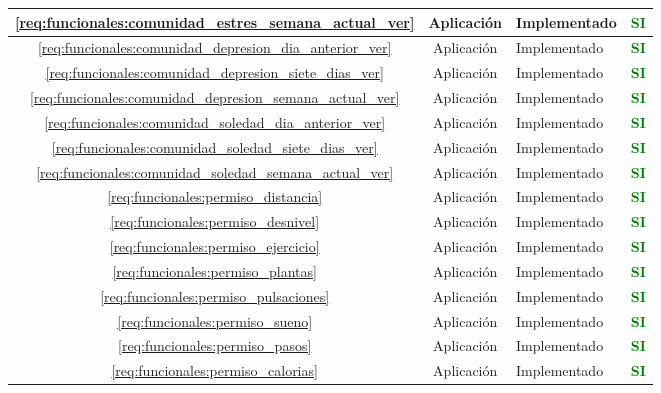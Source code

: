 \begin{xltabular}{\textwidth}{|c|c|X|c|}
        \hline
        \ref{req:funcionales:comunidad_estres_semana_actual_ver} & Aplicación & Implementado & \textcolor{green}{\textbf{SI}} \\
        \hline
        \ref{req:funcionales:comunidad_depresion_dia_anterior_ver} & Aplicación & Implementado & \textcolor{green}{\textbf{SI}} \\
        \hline
        \ref{req:funcionales:comunidad_depresion_siete_dias_ver} & Aplicación & Implementado & \textcolor{green}{\textbf{SI}} \\
        \hline
        \ref{req:funcionales:comunidad_depresion_semana_actual_ver} & Aplicación & Implementado & \textcolor{green}{\textbf{SI}} \\
        \hline
        \ref{req:funcionales:comunidad_soledad_dia_anterior_ver} & Aplicación & Implementado & \textcolor{green}{\textbf{SI}} \\
        \hline
        \ref{req:funcionales:comunidad_soledad_siete_dias_ver} & Aplicación & Implementado & \textcolor{green}{\textbf{SI}} \\
        \hline
        \ref{req:funcionales:comunidad_soledad_semana_actual_ver} & Aplicación & Implementado & \textcolor{green}{\textbf{SI}} \\
        \hline
        \ref{req:funcionales:permiso_distancia} & Aplicación & Implementado & \textcolor{green}{\textbf{SI}} \\
        \hline
        \ref{req:funcionales:permiso_desnivel} & Aplicación & Implementado & \textcolor{green}{\textbf{SI}} \\
        \hline
        \ref{req:funcionales:permiso_ejercicio} & Aplicación & Implementado & \textcolor{green}{\textbf{SI}} \\
        \hline
        \ref{req:funcionales:permiso_plantas} & Aplicación & Implementado & \textcolor{green}{\textbf{SI}} \\
        \hline
        \ref{req:funcionales:permiso_pulsaciones} & Aplicación & Implementado & \textcolor{green}{\textbf{SI}} \\
        \hline
        \ref{req:funcionales:permiso_sueno} & Aplicación & Implementado & \textcolor{green}{\textbf{SI}} \\
        \hline
        \ref{req:funcionales:permiso_pasos} & Aplicación & Implementado & \textcolor{green}{\textbf{SI}} \\
        \hline
        \ref{req:funcionales:permiso_calorias} & Aplicación & Implementado & \textcolor{green}{\textbf{SI}} \\

\end{xltabular}
